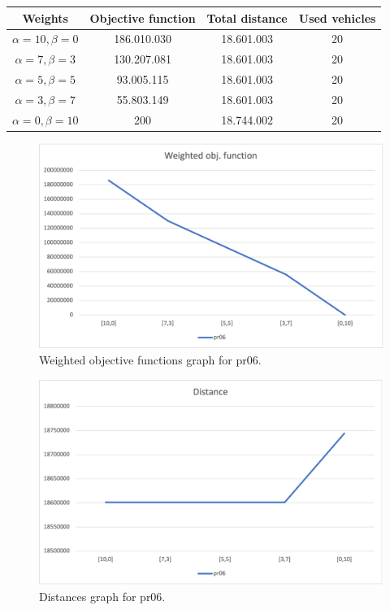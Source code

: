 {
\renewcommand{\arraystretch}{2}
\begin{longtable}[h]{| c | c | c | c |}
    \hline
    \textbf{Weights} & \textbf{Objective function} & \textbf{Total distance} & \textbf{Used vehicles} \\
    \hline
    \endhead
    $\alpha = 10, \beta = 0$ & 186.010.030 & 18.601.003 & 20 \\
    \hline
    $\alpha = 7, \beta = 3$  & 130.207.081 & 18.601.003 & 20 \\
    \hline
    $\alpha = 5, \beta = 5$  &  93.005.115 & 18.601.003 & 20 \\
    \hline
    $\alpha = 3, \beta = 7$  &  55.803.149 & 18.601.003 & 20 \\
    \hline
    $\alpha = 0, \beta = 10$ &         200 & 18.744.002 & 20 \\
    \hline
\end{longtable}
}
\begin{figure}[H]
    \centering
    \includegraphics[width=1.0\columnwidth]{../graphs/pr06-wobjf.png}
    \caption{Weighted objective functions graph for pr06.}
\end{figure}

\begin{figure}[H]
    \centering
    \includegraphics[width=1.0\columnwidth]{../graphs/pr06-distance.png}
    \caption{Distances graph for pr06.}
\end{figure}

